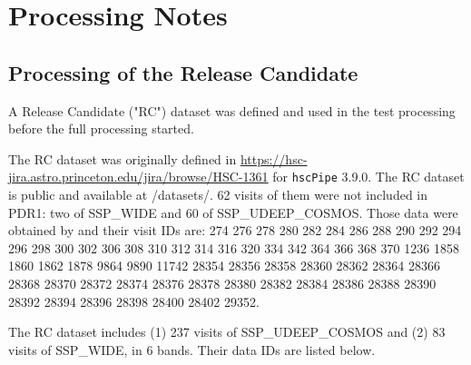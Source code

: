 \documentclass[DM,authoryear,toc]{lsstdoc}
\begin{document}
\section{Processing Notes}
\subsection{Processing of the Release Candidate}

A Release Candidate ("RC") dataset was defined and used in the test processing before the full processing started.

The RC dataset was originally defined in \url{https://hsc-jira.astro.princeton.edu/jira/browse/HSC-1361} for \texttt{hscPipe} 3.9.0.
The RC dataset is public and available at /datasets/. 62 visits of them were not included in PDR1: two of SSP{\_}WIDE and 60 of SSP{\_}UDEEP{\_}COSMOS.
Those data were obtained by  and their visit IDs are: 274 276 278 280 282 284 286 288 290 292 294 296 298 300 302 306 308 310 312 314 316 320 334 342 364 366 368 370 1236 1858 1860 1862 1878 9864 9890 11742 28354 28356 28358 28360 28362 28364 28366 28368 28370 28372 28374 28376 28378 28380 28382 28384 28386 28388 28390 28392 28394 28396 28398 28400 28402 29352.

The RC dataset includes (1) 237 visits of SSP{\_}UDEEP{\_}COSMOS and (2) 83 visits of SSP{\_}WIDE, in 6 bands. Their data IDs are listed below.
\end{document}

